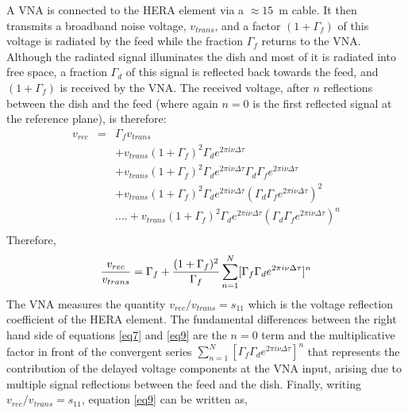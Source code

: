 \documentclass[twocolumn]{emulateapj}
\newcommand{\volt}{{v}}
\newcommand{\dfngexp}{{e^{2\pi i\nu \Delta \tau}}}
\begin{document}
    
     A VNA is connected to the HERA element via a $\approx 15$~m cable. It then transmits
    a broadband noise voltage, $\volt_{trans}$, and a factor $(1+\Gamma_f)$ of this
    voltage is radiated by the feed while the fraction $\Gamma_{f}$ returns to the
    VNA. Although the radiated signal illuminates the dish and most of it is
    radiated into free space, a fraction $\Gamma_d$ of this signal is reflected
    back towards the feed, and $(1+\Gamma_f)$ is received by the VNA.  The received
    voltage, after $n$ reflections between the dish and the feed (where again $n=0$
    is the first reflected signal at the reference plane), is therefore:
    \begin{eqnarray}
    \volt_{rec} & = &  \Gamma_f \volt_{trans} \nonumber \\
             && + \volt_{trans} (1+\Gamma_f)^2 \Gamma_{d} \dfngexp \nonumber \\
             && + \volt_{trans} (1+\Gamma_f)^2 \Gamma_{d} \dfngexp \Gamma_d\Gamma_f\dfngexp \nonumber \\
             && + \volt_{trans} (1+\Gamma_f)^2 \Gamma_{d} \dfngexp (\Gamma_d\Gamma_f\dfngexp)^2 \nonumber \\
    &&  ....+ \volt_{trans} (1+\Gamma_f)^2 \Gamma_{d} \dfngexp (\Gamma_d\Gamma_f\dfngexp)^n \nonumber \\
    \label{eq8}
    \end{eqnarray}
    Therefore, 
    \begin{equation}
    {\volt_{rec}\over \volt_{trans} } = \Gamma_f + \frac{(1+\Gamma_f)^2}{\Gamma_{f}} \displaystyle\sum\limits_{n=1}^{N} [\Gamma_{f}\Gamma_{d}\dfngexp]^{n}
    \label{eq9}
    \end{equation}
    The VNA measures the quantity $\volt_{rec}/\volt_{trans}=s_{11}$ which is the voltage reflection coefficient of the HERA element.
    The fundamental differences between the right hand side of equations \ref{eq7} and \ref{eq9} are the $n=0$ term and the multiplicative factor in front of the convergent series $\displaystyle\sum\limits_{n=1}^{N} [\Gamma_{f}\Gamma_{d}\dfngexp]^{n}$ that represents the contribution of the delayed voltage components at the VNA input, arising due to multiple signal reflections between the feed and the dish. Finally, writing $\volt_{rec}/\volt_{trans}=s_{11}$, equation \ref{eq9} can be written as,
\end{document}
